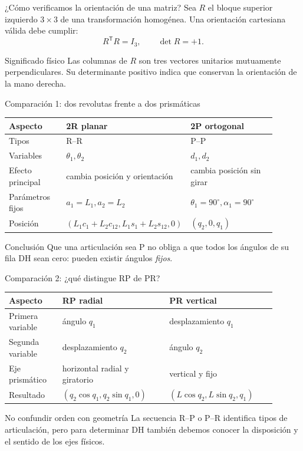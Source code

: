 \documentclass[aspectratio=169,11pt]{beamer}
\begin{document}
\begin{frame}[t]{¿Cómo verificamos la orientación de una matriz?}
 \small
 Sea $R$ el bloque superior izquierdo $3\times3$
 de una transformación homogénea.
 Una orientación cartesiana válida debe cumplir:
 \[
 \boxed{R^{\mathsf T}R=I_3,\qquad \det R=+1.}
 \]
 \pause
 \begin{block}{Significado físico}
 Las columnas de $R$ son tres vectores unitarios
 mutuamente perpendiculares. Su determinante positivo
 indica que conservan la orientación de la mano derecha.
 \end{block}
\end{frame}

\begin{frame}[t]{Comparación 1: dos revolutas frente a dos prismáticas}
 \small
 \begin{tabular}{p{0.22\linewidth}p{0.35\linewidth}p{0.33\linewidth}}
 \toprule
 Aspecto & 2R planar & 2P ortogonal\\\midrule
 Tipos & R--R & P--P\\
 Variables & $\theta_1,\theta_2$ & $d_1,d_2$\\
 Efecto principal & cambia posición y orientación & cambia posición sin girar\\
 Parámetros fijos & $a_1=L_1,a_2=L_2$ & $\theta_1=90^\circ,\alpha_1=90^\circ$\\
 Posición & $(L_1c_1+L_2c_{12},L_1s_1+L_2s_{12},0)$ & $(q_2,0,q_1)$\\
 \bottomrule
 \end{tabular}
 \pause
 \vspace{0.14cm}
 \begin{block}{Conclusión}
 Que una articulación sea P no obliga a que todos los ángulos
 de su fila DH sean cero: pueden existir ángulos \emph{fijos}.
 \end{block}
\end{frame}

\begin{frame}[t]{Comparación 2: ¿qué distingue RP de PR?}
 \small
 \begin{tabular}{p{0.18\linewidth}p{0.36\linewidth}p{0.36\linewidth}}
 \toprule
 Aspecto & RP radial & PR vertical\\\midrule
 Primera variable & ángulo $q_1$ & desplazamiento $q_1$\\
 Segunda variable & desplazamiento $q_2$ & ángulo $q_2$\\
 Eje prismático & horizontal radial y giratorio & vertical y fijo\\
 Resultado & $(q_2\cos q_1,q_2\sin q_1,0)$ & $(L\cos q_2,L\sin q_2,q_1)$\\
 \bottomrule
 \end{tabular}
 \pause
 \vspace{0.22cm}
 \begin{alertblock}{No confundir orden con geometría}
 La secuencia R--P o P--R identifica tipos de articulación,
 pero para determinar DH también debemos conocer
 la disposición y el sentido de los ejes físicos.
 \end{alertblock}
\end{frame}
\end{document}
